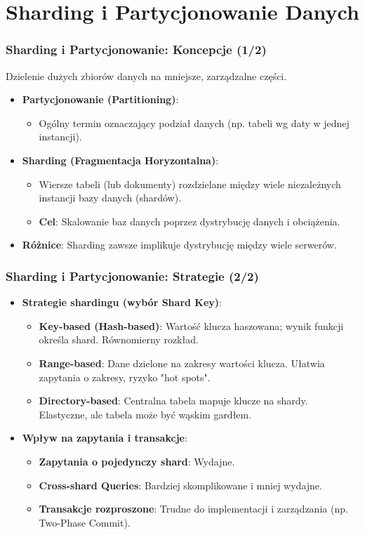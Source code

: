 \documentclass[aspectratio=169,xcolor=table]{beamer}
\begin{document}
\section{Sharding i Partycjonowanie Danych}

\begin{frame}
  \frametitle{Sharding i Partycjonowanie: Koncepcje (1/2)}
  Dzielenie dużych zbiorów danych na mniejsze, zarządzalne części.
  \begin{itemize}
    \item \textbf{Partycjonowanie (Partitioning)}:
        \begin{itemize}
            \item Ogólny termin oznaczający podział danych (np. tabeli wg daty w jednej instancji).
        \end{itemize}
    \item \textbf{Sharding (Fragmentacja Horyzontalna)}:
        \begin{itemize}
            \item Wiersze tabeli (lub dokumenty) rozdzielane między wiele niezależnych instancji bazy danych (shardów).
            \item \textbf{Cel}: Skalowanie baz danych poprzez dystrybucję danych i obciążenia.
        \end{itemize}
    \item \textbf{Różnice}: Sharding zawsze implikuje dystrybucję między wiele serwerów.
  \end{itemize}
\end{frame}

\begin{frame}
  \frametitle{Sharding i Partycjonowanie: Strategie (2/2)}
  \begin{itemize}
    \item \textbf{Strategie shardingu (wybór Shard Key)}:
        \begin{itemize}
            \item \textbf{Key-based (Hash-based)}: Wartość klucza haszowana; wynik funkcji określa shard. Równomierny rozkład.
            \item \textbf{Range-based}: Dane dzielone na zakresy wartości klucza. Ułatwia zapytania o zakresy, ryzyko "hot spots".
            \item \textbf{Directory-based}: Centralna tabela mapuje klucze na shardy. Elastyczne, ale tabela może być wąskim gardłem.
        \end{itemize}
    \item \textbf{Wpływ na zapytania i transakcje}:
        \begin{itemize}
            \item \textbf{Zapytania o pojedynczy shard}: Wydajne.
            \item \textbf{Cross-shard Queries}: Bardziej skomplikowane i mniej wydajne.
            \item \textbf{Transakcje rozproszone}: Trudne do implementacji i zarządzania (np. Two-Phase Commit).
        \end{itemize}
  \end{itemize}
\end{frame}
\end{document}
